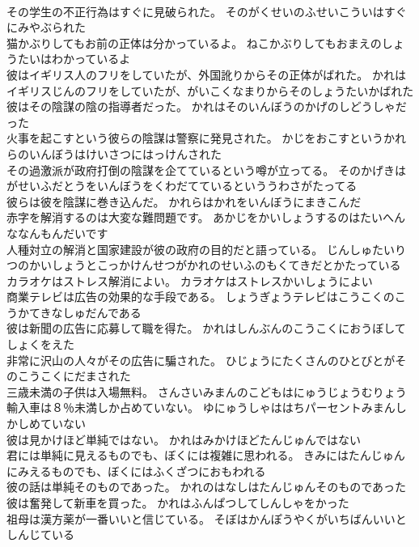 \documentclass[8pt]{extreport}
\begin{document}
\begin{CJK}{UTF8}{min}
\\	その学生の不正行為はすぐに見破られた。	そのがくせいのふせいこういはすぐにみやぶられた 
\\	猫かぶりしてもお前の正体は分かっているよ。	ねこかぶりしてもおまえのしょうたいはわかっているよ 
\\	彼はイギリス人のフリをしていたが、外国訛りからその正体がばれた。	かれはイギリスじんのフリをしていたが、がいこくなまりからそのしょうたいかばれた 
\\	彼はその陰謀の陰の指導者だった。	かれはそのいんぼうのかげのしどうしゃだった 
\\	火事を起こすという彼らの陰謀は警察に発見された。	かじをおこすというかれらのいんぼうはけいさつにはっけんされた 
\\	その過激派が政府打倒の陰謀を企てているという噂が立ってる。	そのかげきはがせいふだとうをいんぼうをくわだてているといううわさがたってる 
\\	彼らは彼を陰謀に巻き込んだ。	かれらはかれをいんぼうにまきこんだ 
\\	赤字を解消するのは大変な難問題です。	あかじをかいしょうするのはたいへんななんもんだいです 
\\	人種対立の解消と国家建設が彼の政府の目的だと語っている。	じんしゅたいりつのかいしょうとこっかけんせつがかれのせいふのもくてきだとかたっている 
\\	カラオケはストレス解消によい。	カラオケはストレスかいしょうによい 
\\	商業テレビは広告の効果的な手段である。	しょうぎょうテレビはこうこくのこうかてきなしゅだんである 
\\	彼は新聞の広告に応募して職を得た。	かれはしんぶんのこうこくにおうぼしてしょくをえた 
\\	非常に沢山の人々がその広告に騙された。	ひじょうにたくさんのひとびとがそのこうこくにだまされた 
\\	三歳未満の子供は入場無料。	さんさいみまんのこどもはにゅうじょうむりょう 
\\	輸入車は８％未満しか占めていない。	ゆにゅうしゃははちパーセントみまんしかしめていない 
\\	彼は見かけほど単純ではない。	かれはみかけほどたんじゅんではない 
\\	君には単純に見えるものでも、ぼくには複雑に思われる。	きみにはたんじゅんにみえるものでも、ぼくにはふくざつにおもわれる 
\\	彼の話は単純そのものであった。	かれのはなしはたんじゅんそのものであった 
\\	彼は奮発して新車を買った。	かれはふんぱつしてしんしゃをかった 
\\	祖母は漢方薬が一番いいと信じている。	そぼはかんぽうやくがいちばんいいとしんじている 

\end{CJK}
\end{document}
